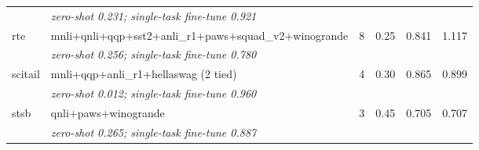 \begin{table}[t]
\begin{tabular}{llrrrr}
    & \multicolumn{5}{l}{\textit{zero-shot 0.231; single-task fine-tune 0.921}} \\
    \addlinespace
    rte & mnli+qnli+qqp+sst2+anli\_r1+paws+squad\_v2+winogrande & 8 & 0.25 & 0.841 & 1.117 \\
    & \multicolumn{5}{l}{\textit{zero-shot 0.256; single-task fine-tune 0.780}} \\
    \addlinespace
    scitail & mnli+qqp+anli\_r1+hellaswag (2 tied) & 4 & 0.30 & 0.865 & 0.899 \\
    & \multicolumn{5}{l}{\textit{zero-shot 0.012; single-task fine-tune 0.960}} \\
    \addlinespace
    stsb & qnli+paws+winogrande & 3 & 0.45 & 0.705 & 0.707 \\
    & \multicolumn{5}{l}{\textit{zero-shot 0.265; single-task fine-tune 0.887}} \\
    \bottomrule
  \end{tabular}
\end{table}
